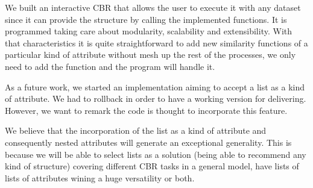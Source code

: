 \documentclass[11pt]{article}
\begin{document}
We built an interactive CBR that allows the user to execute it with any dataset since it can provide the structure by calling the implemented functions. It is programmed taking care about modularity, scalability and extensibility. With that characteristics it is quite straightforward to add new similarity functions of a particular kind of attribute without mesh up the rest of the processes, we only need to add the function and the program will handle it.

As a future work, we started an implementation aiming to accept a list as a kind of attribute. We had to rollback in order to have a working version for delivering. However, we want to remark the code is thought to incorporate this feature.

We believe that the incorporation of the list as a kind of attribute and consequently nested attributes will generate an exceptional generality. This is because we will be able to select lists as a solution (being able to recommend any kind of structure) covering different CBR tasks in a general model, have lists of lists of attributes wining a huge versatility or both.
\end{document}

